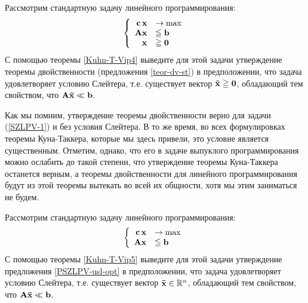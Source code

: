     \begin{exer}
    Рассмотрим стандартную задачу линейного программирования:
\begin{equation}\label{SZLPV-1}
    \left\{
    \begin{array}{rl}
        \mathbf{c} \, \mathbf{x} & \to \max  \\
        \mathbf{A} \mathbf{x} &\leqq \mathbf{b} \\
        \mathbf{x} &\geqq \mathbf{0}\\
    \end{array} \right.
\end{equation}
    С помощью теоремы \ref{Kuhn-T-Vip4} выведите для этой задачи
    утверждение теоремы двойственности (предложения
    \ref{teor-dv-st}) в предположении, что задача удовлетворяет
    условию
    Слейтера, т.е. существует вектор $\mathbf{\bar{x}} \geqq \mathbf{0}$,
    обладающий тем свойством, что $\mathbf{A} \mathbf{\bar{x}} \ll \mathbf{b}$.
\end{exer}

    Как мы помним, утверждение теоремы двойственности верно для
    задачи (\ref{SZLPV-1}) и  без условия Слейтера. В то же время,
    во всех формулировках
    теоремы  Куна-Таккера, которые мы здесь привели, это условие
    является существенным. Отметим, однако, что его в
    задаче выпуклого программирования можно ослабить до такой
    степени, что утверждение теоремы
    Куна-Таккера останется верным, а теоремы двойственности для
    линейного программирования будут из этой теоремы вытекать во всей их
    общности, хотя мы этим заниматься не будем.


    \begin{exer}
    Рассмотрим стандартную задачу линейного программирования:
\begin{equation}\label{SZLPV-1}
    \left\{
    \begin{array}{rl}
        \mathbf{c} \, \mathbf{x} & \to \max  \\
        \mathbf{A} \mathbf{x} &\leqq \mathbf{b} \\
    \end{array} \right.
\end{equation}
    С помощью теоремы \ref{Kuhn-T-Vip5} выведите для этой задачи
    утверждение предложения
    \ref{PSZLPV-usl-opt} в предположении, что задача удовлетворяет
    условию
    Слейтера, т.е. существует вектор $\mathbf{\bar{x}}\in\mathbb{R}^{n}$,
    обладающий тем свойством, что $\mathbf{A} \mathbf{\bar{x}} \ll \mathbf{b}$.
\end{exer}


